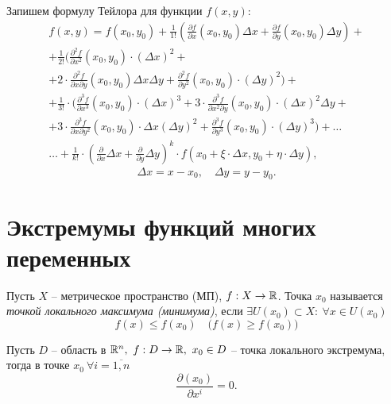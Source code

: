 \begin{example}
    Запишем формулу Тейлора для функции $f(x,y)$:
    \begin{multline*}
        f(x,y) = f(x_0,y_0) + \frac{1}{1!}\left(\frac{\partial f}{\partial x}(x_0,y_0)\Delta x + \frac{\partial f}{\partial y}(x_0,y_0)\Delta y\right) + \\
        + \frac{1}{2!}\bigg(\frac{\partial^2f}{\partial x^2}(x_0,y_0)\cdot (\Delta x)^2 + \\
        + 2 \cdot \frac{\partial^2f}{\partial x \partial y}(x_0,y_0)\Delta x\Delta y + \frac{\partial^2f}{\partial y^2}(x_0,y_0)\cdot(\Delta y)^2\bigg) +\\
        + \frac{1}{3!}\cdot \bigg(\frac{\partial^3f}{\partial x^3}(x_0,y_0) \cdot (\Delta x)^3 + 3 \cdot \frac{\partial^3f}{\partial x^2\partial y}(x_0, y_0) \cdot (\Delta x)^2\Delta y + \\
        + 3\cdot\frac{\partial^3f}{\partial x\partial y^2}(x_0,y_0)\cdot \Delta x(\Delta y)^2 + \frac{\partial^3f}{\partial y^3}(x_0,y_0)\cdot(\Delta y)^3\bigg) + \ldots \\
        \ldots + \frac{1}{k!}\cdot\left(\frac{\partial}{\partial x}\Delta x + \frac{\partial}{\partial y}\Delta y\right)^k \cdot f(x_0 + \xi \cdot \Delta x, y_0 + \eta \cdot \Delta y),
    \end{multline*}
    \[
        \Delta x = x - x_0, \quad \Delta y = y - y_0.
    \]
\end{example}

\section{Экстремумы функций многих переменных}

\begin{definition}
    Пусть $ X $ -- метрическое пространство (МП), $ f:X \rightarrow\mathbb{R} $. Точка $ x_0 $ называется \emph{точкой локального максимума (минимума)}, если $ \exists U(x_0) \subset X: \ \forall x \in U(x_0) $
    \[
        f(x)\leqslant f(x_0) \quad \big(f(x) \geqslant f(x_0)\big)
    \]
\end{definition}

\begin{theorem}
    Пусть $D$ -- область в $ \mathbb{R}^n, \ f:D \rightarrow\mathbb{R}, \ x_0 \in D $ -- точка локального экстремума, тогда в точке $ x_0 \ \forall i = \overline{1,n}$
    \[
        \frac{\partial(x_0)}{\partial x^i} = 0.
    \]
\end{theorem}

